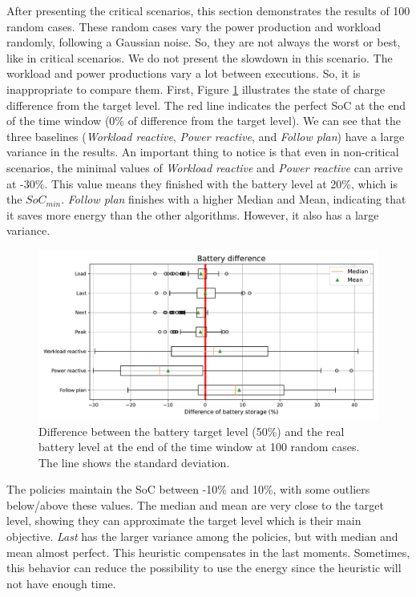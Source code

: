 After presenting the critical scenarios, this section demonstrates the results of 100 random cases. These random cases vary the power production and workload randomly, following a Gaussian noise. So, they are not always the worst or best, like in critical scenarios. We do not present the slowdown in this scenario. The workload and power productions vary a lot between executions. So, it is inappropriate to compare them. First, Figure \ref{fig:SoC_diff} illustrates the state of charge difference from the target level. The red line indicates the perfect SoC at the end of the time window (0\% of difference from the target level). We can see that the three baselines (\emph{Workload reactive}, \emph{Power reactive}, and \emph{Follow plan}) have a large variance in the results. An important thing to notice is that even in non-critical scenarios, the minimal values of \emph{Workload reactive} and \emph{Power reactive} can arrive at -30\%. This value means they finished with the battery level at 20\%, which is the $SoC_{min}$. \emph{Follow plan} finishes with a higher Median and Mean, indicating that it saves more energy than the other algorithms. However, it also has a large variance.

\begin{figure}[!htb]
    \centering
    \includegraphics[scale=0.55]{Images/Compensations/battery_diff.pdf}
    \caption[Difference between the battery target level (50\%) and the real battery level at the end of the time window at 100 random cases.]{Difference between the battery target level (50\%) and the real battery level at the end of the time window at 100 random cases. The line shows the standard deviation.}
    \label{fig:SoC_diff}
\end{figure}

The policies maintain the SoC between -10\% and 10\%, with some outliers below/above these values. The median and mean are very close to the target level, showing they can approximate the target level which is their main objective. \emph{Last} has the larger variance among the policies, but with median and mean almost perfect. This heuristic compensates in the last moments. Sometimes, this behavior can reduce the possibility to use the energy since the heuristic will not have enough time. 

